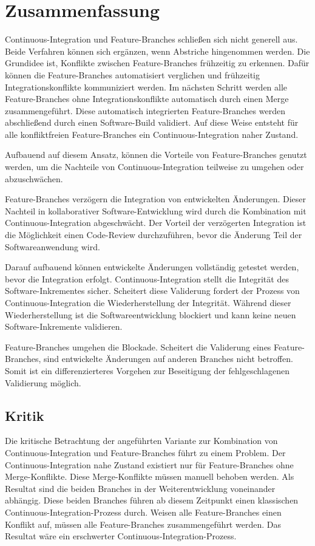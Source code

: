 \chapter{Zusammenfassung}

Continuous-Integration und Feature-Branches schließen sich nicht generell aus. Beide Verfahren können sich ergänzen, wenn Abstriche hingenommen werden. Die Grundidee ist, Konflikte zwischen Feature-Branches frühzeitig zu erkennen. Dafür können die Feature-Branches automatisiert verglichen und frühzeitig Integrationskonflikte kommuniziert werden. Im nächsten Schritt werden alle Feature-Branches ohne Integrationskonflikte automatisch durch einen Merge zusammengeführt. Diese automatisch integrierten Feature-Branches werden abschließend durch einen Software-Build validiert. Auf diese Weise entsteht für alle konfliktfreien Feature-Branches ein Continuous-Integration naher Zustand.

Aufbauend auf diesem Ansatz, können die Vorteile von Feature-Branches genutzt werden, um die Nachteile von Continuous-Integration teilweise zu umgehen oder abzuschwächen.

Feature-Branches verzögern die Integration von entwickelten Änderungen. Dieser \\Nachteil in kollaborativer Software-Entwicklung wird durch die Kombination mit Continuous\hyp{}Integration abgeschwächt. Der Vorteil der verzögerten Integration ist die Möglichkeit einen Code-Review durchzuführen, bevor die Änderung Teil der Softwareanwendung wird. 

Darauf aufbauend können entwickelte Änderungen vollständig getestet werden, bevor die Integration erfolgt. Continuous-Integration stellt die Integrität des Software\hyp{}Inkrementes sicher. Scheitert diese Validerung fordert der Prozess von Continuous-Integration die Wiederherstellung der Integrität. Während dieser Wiederherstellung ist die Softwareentwicklung blockiert und kann keine neuen Software-Inkremente validieren. 

Feature-Branches umgehen die Blockade. Scheitert die Validerung eines Feature\hyp{}Branches, sind entwickelte Änderungen auf anderen Branches nicht betroffen. Somit ist ein differenzierteres Vorgehen zur Beseitigung der fehlgeschlagenen Validierung möglich.

\section{Kritik}

Die kritische Betrachtung der angeführten Variante zur Kombination von Continuous\hyp{}Integration und Feature-Branches führt zu einem Problem. Der Continuous-Integration nahe Zustand existiert nur für Feature-Branches ohne Merge-Konflikte. Diese Merge-Konflikte müssen manuell behoben werden. Als Resultat sind die beiden Branches in der Weiterentwicklung voneinander abhängig. Diese beiden Branches führen ab diesem Zeitpunkt einen \glqq klassischen\grqq{} Continuous-Integration-Prozess durch. Weisen alle Feature-Branches einen Konflikt auf, müssen alle Feature-Branches zusammengeführt werden. Das Resultat wäre ein \glqq erschwerter\grqq{} Continuous-Integration-Prozess.

